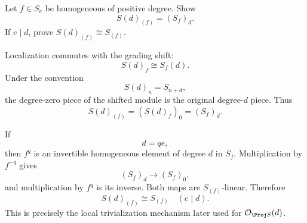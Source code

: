 \begin{problem}\label{prob:vi34-15}
Let \(f\in S_e\) be homogeneous of positive degree. Show
\[
S(d)_{(f)}=(S_f)_d.
\]
If \(e\mid d\), prove \(S(d)_{(f)}\cong S_{(f)}\).

\end{problem}

\ifdefined\FullProblemDossiers
\begin{solution}
Localization commutes with the grading shift:
\[
S(d)_f\cong S_f(d).
\]
Under the convention
\[
S(d)_n=S_{n+d},
\]
the degree-zero piece of the shifted module is the original degree-\(d\) piece. Thus
\[
\boxed{
S(d)_{(f)}=(S(d)_f)_0=(S_f)_d.
}
\]

If
\[
d=qe,
\]
then \(f^q\) is an invertible homogeneous element of degree \(d\) in \(S_f\). Multiplication by \(f^{-q}\) gives
\[
(S_f)_d\longrightarrow(S_f)_0,
\]
and multiplication by \(f^q\) is its inverse. Both maps are \(S_{(f)}\)-linear. Therefore
\[
\boxed{
S(d)_{(f)}\cong S_{(f)}
\quad(e\mid d).
}
\]
This is precisely the local trivialization mechanism later used for \(\mathcal O_{\Proj S}(d)\).
\end{solution}
\fi
